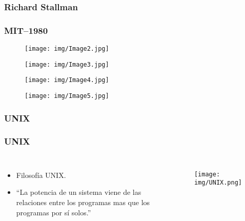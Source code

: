 \documentclass{beamer}
\begin{document}
\AtBeginSubsubsection[]
{
  \begin{frame}
    \tableofcontents[sectionstyle=show/shaded,subsectionstyle=show/shaded/hide,subsubsectionstyle=show/shaded/hide]
  \end{frame}
}
\subsubsection{Richard Stallman}

\begin{frame}
  \frametitle{MIT--1980}
  \begin{figure}[H]
    \centering
    \texttt{[image: img/Image2.jpg]}
  \end{figure}
\end{frame}

\begin{frame}
  \begin{figure}[H]
    \centering
    \texttt{[image: img/Image3.jpg]}
  \end{figure}
\end{frame}

\begin{frame}
  \begin{figure}[H]
    \centering
    \texttt{[image: img/Image4.jpg]}
  \end{figure}
\end{frame}

\begin{frame}
  \begin{figure}[H]
    \centering
    \texttt{[image: img/Image5.jpg]}
  \end{figure}
\end{frame}


\AtBeginSubsubsection[]
{
  \begin{frame}
    \tableofcontents[sectionstyle=show/shaded,subsectionstyle=show/shaded/hide,subsubsectionstyle=show/shaded/hide]
  \end{frame}
}
\subsubsection{UNIX}
\begin{frame}
  \frametitle{UNIX}
  \begin{columns}
    \begin{itemize}
      \item Filosofía UNIX.
      \item ``La potencia de un sistema viene de las relaciones entre los programas mas que los programas por sí solos.''
    \end{itemize}

    \begin{figure}[H]
      \centering
      \texttt{[image: img/UNIX.png]}
    \end{figure}
  \end{columns}
\end{frame}
\end{document}
